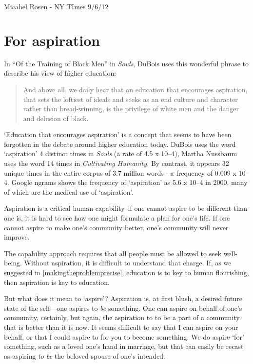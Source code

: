 Micahel Rosen - NY TImes 9\slash 6\slash 12

\chapter{For aspiration}
\label{foraspiration}

In ``Of the Training of Black Men'' in \emph{Souls}, DuBois uses this wonderful phrase to describe his view of higher education:

\begin{quote}

And above all, we daily hear that an education that encourages aspiration, that sets the loftiest of ideals and seeks as an end culture and character rather than bread-winning, is the privilege of white men and the danger and delusion of black.
\end{quote}

`Education that encourages aspiration' is a concept that seems to have been forgotten in the debate around higher education today. DuBois uses the word `aspiration' 4 distinct times in \emph{Souls} (a rate of 4.5 x 10--4), Martha Nussbaum uses the word 14 times in \emph{Cultivating Humanity.} By contrast, it appears 32 unique times in the entire corpus of 3.7 million words - a frequency of 0.009 x 10--4. Google ngrams shows the frequency of `aspiration' as 5.6 x 10--4 in 2000, many of which are the medical use of `aspiration'.

Aspiration is a critical human capability--if one cannot aspire to be different than one is, it is hard to see how one might formulate a plan for one's life. If one cannot aspire to make one's community better, one's community will never improve. 

The capability approach requires that all people must be allowed to seek well-being. Without aspiration, it is difficult to understand that charge. If, as we suggested in \ref{makingtheproblemprecise}, education is to key to human flourishing, then aspiration is key to education.

But what does it mean to `aspire'? Aspiration is, at first blush, a desired future state of the self---one aspires to \emph{be} something. One can aspire on behalf of one's community, certainly, but again, the aspiration to to be a part of a community that is better than it is now. It seems difficult to say that I can aspire on your behalf, or that I could aspire to for you to become something. We do aspire `for' something, such as a loved one's hand in marriage, but that can easily be recast as aspiring \emph{to be} the beloved spouse of one's intended.

